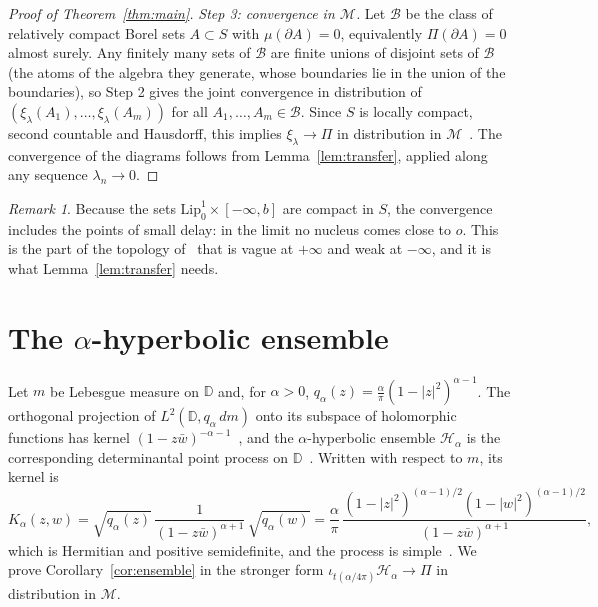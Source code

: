 \documentclass[11pt]{amsart}
\theoremstyle{definition}
\theoremstyle{remark}
\newtheorem{remark}[theorem]{Remark}
\newcommand{\D}{\mathbb{D}}
\newcommand{\M}{\mathcal{M}}
\newcommand{\Lip}{\mathrm{Lip}}
\begin{document}
\begin{proof}[Proof of Theorem~\ref{thm:main}]
\emph{Step 3: convergence in $\M$.} Let $\mathcal B$ be the class of relatively compact Borel sets $A\subset S$ with
$\mu(\partial A)=0$, equivalently $\Pi(\partial A)=0$ almost surely. Any finitely many sets of $\mathcal B$ are finite
unions of disjoint sets of $\mathcal B$ (the atoms of the algebra they generate, whose boundaries lie in the union of
the boundaries), so Step 2 gives the joint convergence in distribution of $(\xi_\lambda(A_1),\dots,\xi_\lambda(A_m))$ for
all $A_1,\dots,A_m\in\mathcal B$. Since $S$ is locally compact, second countable and Hausdorff, this implies
$\xi_\lambda\to\Pi$ in distribution in $\M$~\cite[Theorem~4.11]{Kal17}. The convergence of the diagrams follows from
Lemma~\ref{lem:transfer}, applied along any sequence $\lambda_n\to0$.
\end{proof}

\begin{remark}
Because the sets $\Lip^1_0\times[-\infty,b]$ are compact in $S$, the convergence includes the points of small delay:
in the limit no nucleus comes close to $o$. This is the part of the topology of~\cite[Section~3.1]{DK26} that is
vague at $+\infty$ and weak at $-\infty$, and it is what Lemma~\ref{lem:transfer} needs.
\end{remark}

\section{\texorpdfstring{The $\alpha$-hyperbolic ensemble}{The alpha-hyperbolic ensemble}}\label{sec:ensemble}

Let $m$ be Lebesgue measure on $\D$ and, for $\alpha>0$, $q_\alpha(z)=\frac\alpha\pi(1-|z|^2)^{\alpha-1}$. The
orthogonal projection of $L^2(\D,q_\alpha\,dm)$ onto its subspace of holomorphic functions has kernel
$(1-z\bar w)^{-\alpha-1}$~\cite[Section~4.3.11]{HKPV09}, and the $\alpha$-hyperbolic ensemble $\mathcal H_\alpha$ is the
corresponding determinantal point process on $\D$~\cite[Definition~1.2]{BGZL23}. Written with respect to $m$, its
kernel is
\[
  K_\alpha(z,w)=\sqrt{q_\alpha(z)}\,\frac{1}{(1-z\bar w)^{\alpha+1}}\,\sqrt{q_\alpha(w)}
  =\frac\alpha\pi\,\frac{(1-|z|^2)^{(\alpha-1)/2}(1-|w|^2)^{(\alpha-1)/2}}{(1-z\bar w)^{\alpha+1}},
\]
which is Hermitian and positive semidefinite, and the process is simple~\cite[Chapter~4]{HKPV09}. We prove Corollary~\ref{cor:ensemble} in the stronger form
$\iota_{t(\alpha/4\pi)}\mathcal H_\alpha\to\Pi$ in distribution in $\M$.
\end{document}
